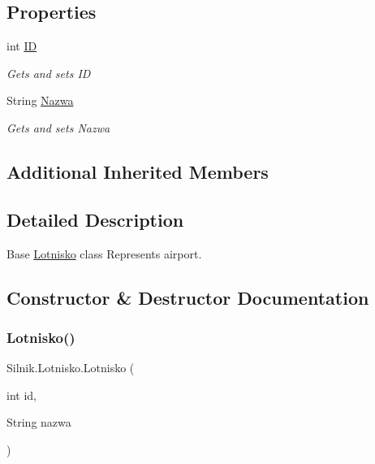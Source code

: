 \subsection*{Properties}
\begin{DoxyCompactItemize}
\item 
int \mbox{\hyperlink{class_silnik_1_1_lotnisko_a3b58935c64a4b7ebe2a3548b5f968583}{ID}}
\begin{DoxyCompactList}\small\item\em Gets and sets ID \end{DoxyCompactList}\item 
String \mbox{\hyperlink{class_silnik_1_1_lotnisko_a9f92f264a5a3b2e5a8393fff6314d4ea}{Nazwa}}
\begin{DoxyCompactList}\small\item\em Gets and sets Nazwa \end{DoxyCompactList}\end{DoxyCompactItemize}
\subsection*{Additional Inherited Members}


\subsection{Detailed Description}
Base \mbox{\hyperlink{class_silnik_1_1_lotnisko}{Lotnisko}} class Represents airport. 



\subsection{Constructor \& Destructor Documentation}
\mbox{\label{class_silnik_1_1_lotnisko_a42eff5febfea199bc94edab1693e801a}} 
\subsubsection{\texorpdfstring{Lotnisko()}{Lotnisko()}\hspace{0.1cm}{\footnotesize\ttfamily [1/2]}}
{\footnotesize\ttfamily Silnik.\+Lotnisko.\+Lotnisko (\begin{DoxyParamCaption}\item[{int}]{id,  }\item[{String}]{nazwa }\end{DoxyParamCaption})}



